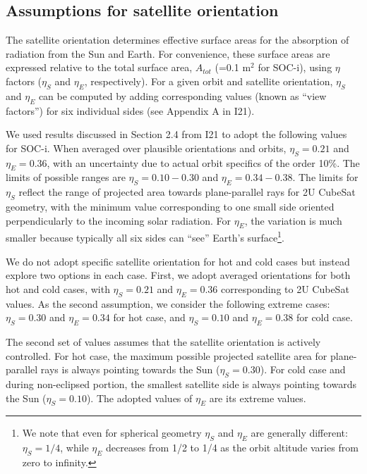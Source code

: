 \documentclass[]{aastex62}
\begin{document}
\subsection{Assumptions for satellite orientation}

The satellite orientation determines effective surface areas for the absorption of radiation from 
the Sun and Earth. For convenience, these surface areas are expressed relative to the total surface area, $A_{tot}$
(=0.1 m$^2$ for SOC-i), using $\eta$ factors ($\eta_S$ and $\eta_E$, respectively). For a given 
orbit and satellite orientation, $\eta_S$ and $\eta_E$ can be computed by adding corresponding
values (known as ``view factors'') for six individual sides (see Appendix A in I21).  

We used results discussed in Section 2.4 from I21 to adopt the following values for SOC-i.
When averaged over plausible orientations and orbits, $\eta_S = 0.21$ and $\eta_E = 0.36$, 
with an uncertainty due to actual orbit specifics of the order 10\%. The limits of 
possible ranges are  $\eta_S = 0.10 - 0.30$ and $\eta_E = 0.34 - 0.38$. The limits for 
$\eta_S$ reflect the range of projected area towards plane-parallel rays for 2U CubeSat geometry, 
with the minimum value corresponding to one small side oriented perpendicularly to the incoming 
solar radiation. For $\eta_E$, the variation is much smaller because typically all six sides can 
``see'' Earth's surface\footnote{We note that even for spherical geometry $\eta_S$ and $\eta_E$
are generally different:  $\eta_S=1/4$, while $\eta_E$ decreases from 1/2 to 1/4 as the orbit
altitude varies from zero to infinity.}. 
 
We do not adopt specific satellite orientation for hot and cold cases but instead explore two 
options in each case.  First, we adopt averaged orientations for both hot and cold cases,
with $\eta_S = 0.21$ and $\eta_E = 0.36$ corresponding to 2U CubeSat values. As the second 
assumption, we consider the following extreme cases: $\eta_S = 0.30$ and $\eta_E = 0.34$ for 
hot case, and $\eta_S = 0.10$ and $\eta_E = 0.38$ for cold case.  
 
The second set of values assumes that the satellite orientation is actively controlled.  For hot
case, the maximum possible projected satellite area for plane-parallel rays is always pointing 
towards the Sun ($\eta_S = 0.30$). For cold case and during non-eclipsed portion, the smallest 
satellite side is always pointing towards the Sun ($\eta_S = 0.10$).  The adopted values of 
$\eta_E$ are its extreme values. 
\end{document}
